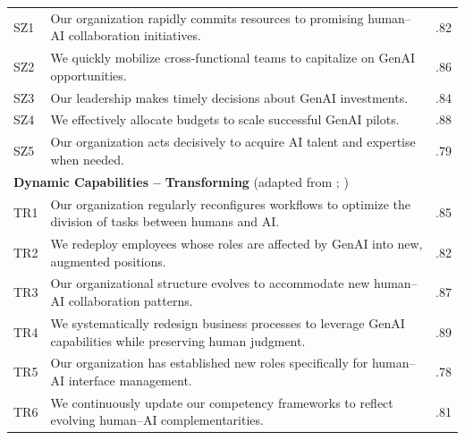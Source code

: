 \documentclass[12pt, a4paper]{article}
\begin{document}
\begin{table}[H]
\begin{tabularx}{\textwidth}{p{0.6cm}Xc}
SZ1 & Our organization rapidly commits resources to promising human--AI collaboration initiatives. & .82 \\
SZ2 & We quickly mobilize cross-functional teams to capitalize on GenAI opportunities. & .86 \\
SZ3 & Our leadership makes timely decisions about GenAI investments. & .84 \\
SZ4 & We effectively allocate budgets to scale successful GenAI pilots. & .88 \\
SZ5 & Our organization acts decisively to acquire AI talent and expertise when needed. & .79 \\
\midrule
\multicolumn{3}{l}{\textbf{Dynamic Capabilities -- Transforming} (adapted from \citealt{Pavlou2011}; \citealt{Warner2019})} \\
TR1 & Our organization regularly reconfigures workflows to optimize the division of tasks between humans and AI. & .85 \\
TR2 & We redeploy employees whose roles are affected by GenAI into new, augmented positions. & .82 \\
TR3 & Our organizational structure evolves to accommodate new human--AI collaboration patterns. & .87 \\
TR4 & We systematically redesign business processes to leverage GenAI capabilities while preserving human judgment. & .89 \\
TR5 & Our organization has established new roles specifically for human--AI interface management. & .78 \\
TR6 & We continuously update our competency frameworks to reflect evolving human--AI complementarities. & .81 \\
\bottomrule
\end{tabularx}
\end{table}
\end{document}

